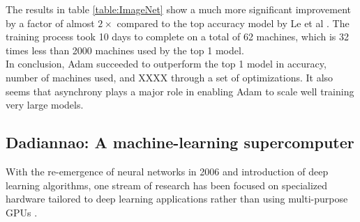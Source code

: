 \documentclass[runningheads,a4paper]{llncs}
\begin{document}
The results in table \ref{table:ImageNet} show a much more significant improvement by a factor of almost $2\times$ compared to the top accuracy model by Le et al \cite{le2013building}. The training process took 10 days to complete on a total of 62 machines, which is 32 times less than 2000 machines used by the top 1 model.\\

In conclusion, Adam succeeded to outperform the top 1 model in accuracy, number of machines used, and XXXX through a set of optimizations. It also seems that asynchrony plays a major role in enabling Adam to scale well training very large models.




\subsection*{Dadiannao: A machine-learning supercomputer \cite{chen2014dadiannao}}
With the re-emergence of neural networks in 2006 and introduction of deep learning algorithms, one stream of research has been focused on specialized hardware tailored to deep learning applications rather than using multi-purpose GPUs \cite{temam2012defect}\cite{esmaeilzadeh2012neural}.\\
\end{document}
